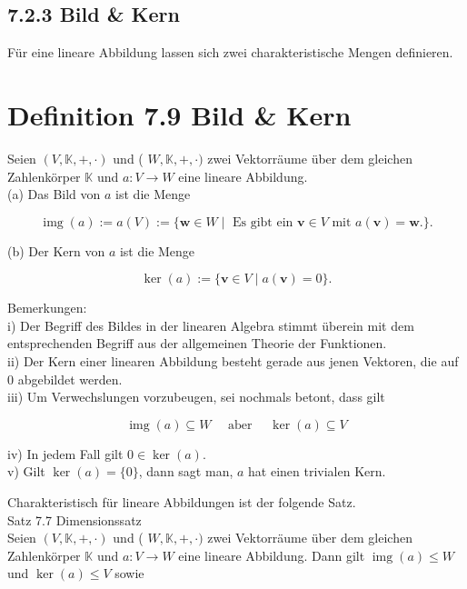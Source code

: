 \documentclass[10pt]{article}
\begin{document}
\subsection*{7.2.3 Bild \& Kern}
Für eine lineare Abbildung lassen sich zwei charakteristische Mengen definieren.

\section*{Definition 7.9 Bild \& Kern}
Seien $(V, \mathbb{K},+, \cdot)$ und ( $W, \mathbb{K},+, \cdot)$ zwei Vektorräume über dem gleichen Zahlenkörper $\mathbb{K}$ und $a: V \rightarrow W$ eine lineare Abbildung.\\
(a) Das Bild von $a$ ist die Menge


\begin{equation*}
\operatorname{img}(a):=a(V):=\{\mathbf{w} \in W \mid \text { Es gibt ein } \mathbf{v} \in V \text { mit } a(\mathbf{v})=\mathbf{w} .\} . \tag{7.43}
\end{equation*}


(b) Der Kern von $a$ ist die Menge


\begin{equation*}
\operatorname{ker}(a):=\{\mathbf{v} \in V \mid a(\mathbf{v})=0\} . \tag{7.44}
\end{equation*}


Bemerkungen:\\
i) Der Begriff des Bildes in der linearen Algebra stimmt überein mit dem entsprechenden Begriff aus der allgemeinen Theorie der Funktionen.\\
ii) Der Kern einer linearen Abbildung besteht gerade aus jenen Vektoren, die auf 0 abgebildet werden.\\
iii) Um Verwechslungen vorzubeugen, sei nochmals betont, dass gilt


\begin{equation*}
\operatorname{img}(a) \subseteq W \quad \text { aber } \quad \operatorname{ker}(a) \subseteq V \tag{7.45}
\end{equation*}


iv) In jedem Fall gilt $0 \in \operatorname{ker}(a)$.\\
v) Gilt $\operatorname{ker}(a)=\{0\}$, dann sagt man, $a$ hat einen trivialen Kern.

Charakteristisch für lineare Abbildungen ist der folgende Satz.\\
Satz 7.7 Dimensionssatz\\
Seien $(V, \mathbb{K},+, \cdot)$ und ( $W, \mathbb{K},+, \cdot)$ zwei Vektorräume über dem gleichen Zahlenkörper $\mathbb{K}$ und $a: V \rightarrow W$ eine lineare Abbildung. Dann gilt $\operatorname{img}(a) \leq W$ und $\operatorname{ker}(a) \leq V$ sowie
\end{document}
